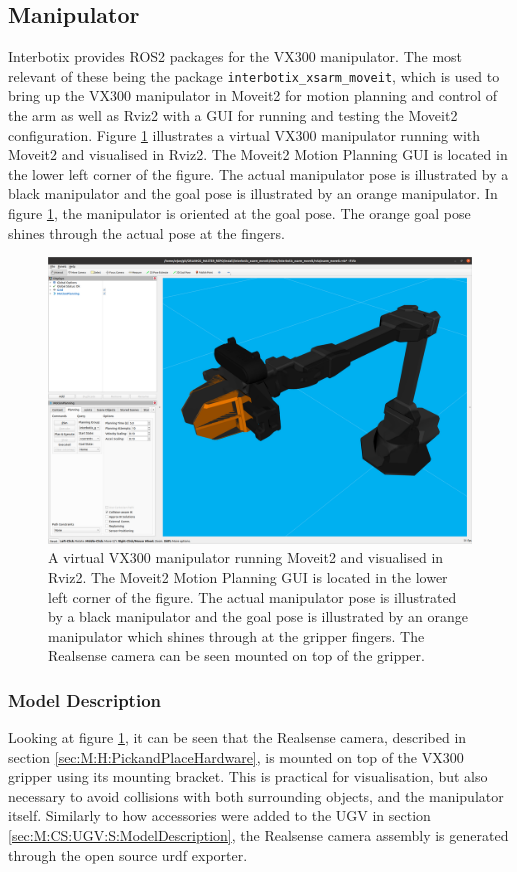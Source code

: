 \subsection{Manipulator}\label{sec:M:MRC:Manipulator}
Interbotix provides ROS2 packages for the VX300 manipulator. The most relevant of these being the package \lstinline{interbotix_xsarm_moveit}, which is used to bring up the VX300 manipulator in Moveit2 for motion planning and control of the arm as well as Rviz2 with a GUI for running and testing the Moveit2 configuration. Figure \ref{fig:VX300Moveit} illustrates a virtual VX300 manipulator running with Moveit2 and visualised in Rviz2. The Moveit2 Motion Planning GUI is located in the lower left corner of the figure. The actual manipulator pose is illustrated by a black manipulator and the goal pose is illustrated by an orange manipulator. In figure \ref{fig:VX300Moveit}, the manipulator is oriented at the goal pose. The orange goal pose shines through the actual pose at the fingers.

\begin{figure}[htp]
  \centering
  \includegraphics[width = 1\textwidth]{Figures/figVX300Moveit.png}
  \caption{A virtual VX300 manipulator running Moveit2 and visualised in Rviz2. The Moveit2 Motion Planning GUI is located in the lower left corner of the figure. The actual manipulator pose is illustrated by a black manipulator and the goal pose is illustrated by an orange manipulator which shines through at the gripper fingers. The Realsense camera can be seen mounted on top of the gripper.}
  \label{fig:VX300Moveit}
\end{figure}

\subsubsection{Model Description}
Looking at figure \ref{fig:VX300Moveit}, it can be seen that the Realsense camera, described in section \ref{sec:M:H:PickandPlaceHardware}, is mounted on top of the VX300 gripper using its mounting bracket. This is practical for visualisation, but also necessary to avoid collisions with both surrounding objects, and the manipulator itself. Similarly to how accessories were added to the UGV in section \ref{sec:M:CS:UGV:S:ModelDescription}, the Realsense camera assembly is generated through the open source urdf exporter\cite{urdf_exporter}. 

